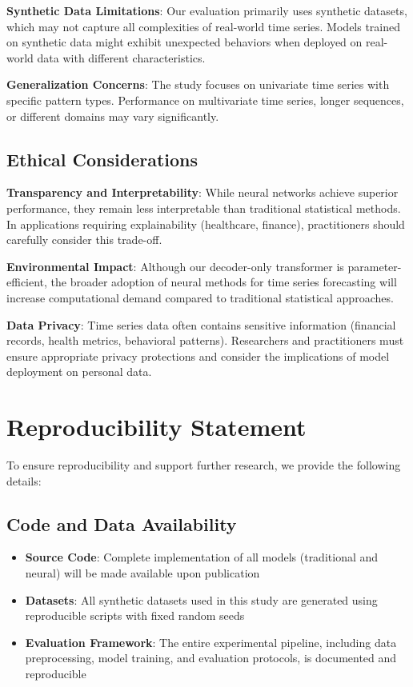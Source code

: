 \documentclass[11pt]{article}
\begin{document}
\textbf{Synthetic Data Limitations}: Our evaluation primarily uses synthetic datasets, which may not capture all complexities of real-world time series. Models trained on synthetic data might exhibit unexpected behaviors when deployed on real-world data with different characteristics.

\textbf{Generalization Concerns}: The study focuses on univariate time series with specific pattern types. Performance on multivariate time series, longer sequences, or different domains may vary significantly.

\subsection*{Ethical Considerations}

\textbf{Transparency and Interpretability}: While neural networks achieve superior performance, they remain less interpretable than traditional statistical methods. In applications requiring explainability (healthcare, finance), practitioners should carefully consider this trade-off.

\textbf{Environmental Impact}: Although our decoder-only transformer is parameter-efficient, the broader adoption of neural methods for time series forecasting will increase computational demand compared to traditional statistical approaches.

\textbf{Data Privacy}: Time series data often contains sensitive information (financial records, health metrics, behavioral patterns). Researchers and practitioners must ensure appropriate privacy protections and consider the implications of model deployment on personal data.

\section*{Reproducibility Statement}

To ensure reproducibility and support further research, we provide the following details:

\subsection*{Code and Data Availability}

\begin{itemize}
\item \textbf{Source Code}: Complete implementation of all models (traditional and neural) will be made available upon publication
\item \textbf{Datasets}: All synthetic datasets used in this study are generated using reproducible scripts with fixed random seeds
\item \textbf{Evaluation Framework}: The entire experimental pipeline, including data preprocessing, model training, and evaluation protocols, is documented and reproducible
\end{itemize}
\end{document}
